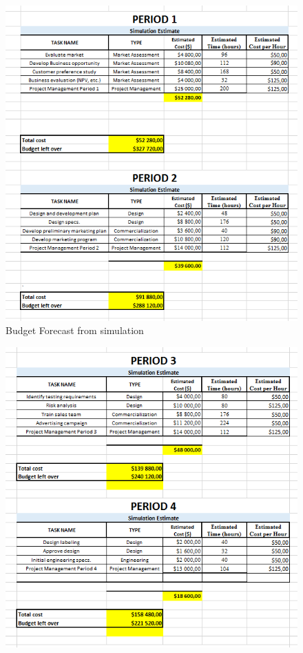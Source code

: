 \begin{appendices}
\begin{figure}[H]
\includegraphics[scale=1]{budget_forecast_sim_12.PNG}
\caption{Budget Forecast from simulation}
\end{figure}
\begin{figure}[H]
\includegraphics[scale=1]{budget_forecast_sim_34.PNG}

\end{figure}
\end{appendices}
